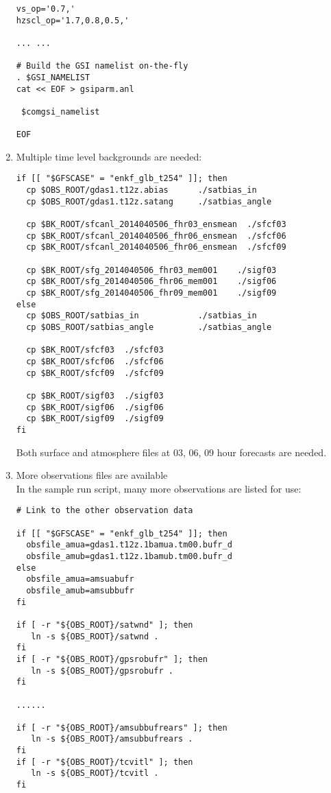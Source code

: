 \begin{enumerate}
\begin{scriptsize}
\begin{verbatim}
vs_op='0.7,'
hzscl_op='1.7,0.8,0.5,'

... ...

# Build the GSI namelist on-the-fly
. $GSI_NAMELIST
cat << EOF > gsiparm.anl

 $comgsi_namelist

EOF
\end{verbatim}
\end{scriptsize}
\item Multiple time level backgrounds are needed:
\begin{scriptsize}
\begin{verbatim}
if [[ "$GFSCASE" = "enkf_glb_t254" ]]; then
  cp $OBS_ROOT/gdas1.t12z.abias      ./satbias_in
  cp $OBS_ROOT/gdas1.t12z.satang     ./satbias_angle

  cp $BK_ROOT/sfcanl_2014040506_fhr03_ensmean  ./sfcf03
  cp $BK_ROOT/sfcanl_2014040506_fhr06_ensmean  ./sfcf06
  cp $BK_ROOT/sfcanl_2014040506_fhr06_ensmean  ./sfcf09

  cp $BK_ROOT/sfg_2014040506_fhr03_mem001    ./sigf03
  cp $BK_ROOT/sfg_2014040506_fhr06_mem001    ./sigf06
  cp $BK_ROOT/sfg_2014040506_fhr09_mem001    ./sigf09
else
  cp $OBS_ROOT/satbias_in            ./satbias_in
  cp $OBS_ROOT/satbias_angle         ./satbias_angle

  cp $BK_ROOT/sfcf03  ./sfcf03
  cp $BK_ROOT/sfcf06  ./sfcf06
  cp $BK_ROOT/sfcf09  ./sfcf09

  cp $BK_ROOT/sigf03  ./sigf03
  cp $BK_ROOT/sigf06  ./sigf06
  cp $BK_ROOT/sigf09  ./sigf09
fi
\end{verbatim}
\end{scriptsize}
Both surface and atmosphere files at 03, 06, 09 hour forecasts are needed. \\
\item More  observations files are available\\
In the sample run script, many more  observations are listed for use:
\begin{scriptsize}
\begin{verbatim}
# Link to the other observation data

if [[ "$GFSCASE" = "enkf_glb_t254" ]]; then
  obsfile_amua=gdas1.t12z.1bamua.tm00.bufr_d
  obsfile_amub=gdas1.t12z.1bamub.tm00.bufr_d
else
  obsfile_amua=amsuabufr
  obsfile_amub=amsubbufr
fi

if [ -r "${OBS_ROOT}/satwnd" ]; then
   ln -s ${OBS_ROOT}/satwnd .
fi
if [ -r "${OBS_ROOT}/gpsrobufr" ]; then
   ln -s ${OBS_ROOT}/gpsrobufr .
fi

......

if [ -r "${OBS_ROOT}/amsubbufrears" ]; then
   ln -s ${OBS_ROOT}/amsubbufrears .
fi
if [ -r "${OBS_ROOT}/tcvitl" ]; then
   ln -s ${OBS_ROOT}/tcvitl .
fi
\end{verbatim}
\end{scriptsize}
\end{enumerate}


